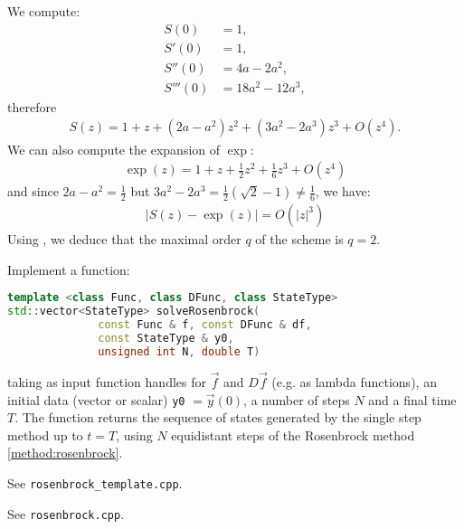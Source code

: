 \begin{problem}
\begin{subproblem}[3]
 \begin{solution}
  We compute:
  \begin{align*}
   S(0) & = 1, \\
   S'(0) & = 1, \\
   S''(0) & = 4a - 2 a^2, \\
   S'''(0) & = 18a^2 - 12a^3,
  \end{align*}
   therefore
   \begin{align*}
    S(z) = 1 + z + (2a - a^2) z^2 + (3a^2 - 2a^3) z^3 + O(z^4).
   \end{align*}
  We can also compute the expansion of $\exp$:
   \begin{align*}
    \exp(z) = 1 + z + \frac{1}{2} z^2 + \frac{1}{6} z^3 + O(z^4)
   \end{align*}
   and since $2a - a^2 = \frac{1}{2}$ but $3a^2 - 2a^3 = \frac{1}{2}(\sqrt{2}-1) \neq \frac{1}{6}$, we have:
 \begin{align*}
  \lvert S(z) - \exp(z) \rvert = O(\lvert z \rvert^3)
 \end{align*}
 Using , we deduce that the maximal order $q$ of the scheme is $q = 2$.
 \end{solution}
\end{subproblem}

\begin{subproblem}[2]
 Implement a \Cpp{} function:
\begin{lstlisting}[language=c++]
template <class Func, class DFunc, class StateType>
std::vector<StateType> solveRosenbrock(
		      const Func & f, const DFunc & df,
		      const StateType & y0,
		      unsigned int N, double T)
 \end{lstlisting}
 taking as input function handles for $\vec{f}$ and $D\vec{f}$ (e.g. as lambda
 functions), an initial data (vector or scalar) \verb|y0| $= \vec{y}(0)$, a number
 of steps $N$ and a final time $T$. The function returns the sequence of states generated
 by the single step method up to $t = T$, using $N$ equidistant steps of the
 Rosenbrock method \eqref{method:rosenbrock}.
 
 \cprotEnv \begin{hint}
  See \verb|rosenbrock_template.cpp|.
 \end{hint}
 
 \cprotEnv \begin{solution}
  See \verb|rosenbrock.cpp|.
 \end{solution}
\end{subproblem}


\end{problem}
